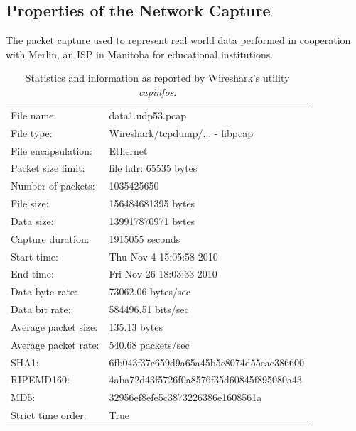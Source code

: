 \documentclass[12pt]{report}
\theoremstyle{remark}
\theoremstyle{definition}
\theoremstyle{definition}
\theoremstyle{definition}
\begin{document}
\begin{appendices}
\chapter{Properties of the Network Capture}
\label{appendix-capturestats}

The packet capture used to represent real world data performed in cooperation with Merlin, an ISP in Manitoba for educational institutions.

\begin{table}[h]
\centering
\begin{tabular}{ l l }
File name:           &data1.udp53.pcap\\
File type:           &Wireshark/tcpdump/... - libpcap\\
File encapsulation:  &Ethernet\\
Packet size limit:   &file hdr: 65535 bytes\\
Number of packets:   &1035425650\\
File size:           &156484681395 bytes\\
Data size:           &139917870971 bytes\\
Capture duration:    &1915055 seconds\\
Start time:          &Thu Nov  4 15:05:58 2010\\
End time:            &Fri Nov 26 18:03:33 2010\\
Data byte rate:      &73062.06 bytes/sec\\
Data bit rate:       &584496.51 bits/sec\\
Average packet size: &135.13 bytes\\
Average packet rate: &540.68 packets/sec\\
SHA1:                &6fb043f37e659d9a65a45b5c8074d55eae386600\\
RIPEMD160:           &4aba72d43f5726f0a8576f35d60845f895080a43\\
MD5:                 &32956ef8efe5c3873226386e1608561a\\
Strict time order:   &True\\
\end{tabular}
\caption[Packet Capture Statistics from \emph{capinfos}]{Statistics and information as reported by Wireshark's utility \emph{capinfos}.}
\label{TABLE_capinfos}
\end{table}

%



\end{appendices}
\end{document}

